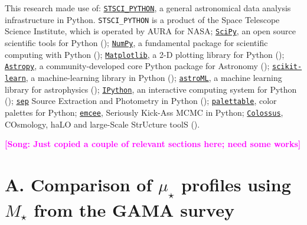 \documentclass[a4paper,fleqn,usenatbib]{mnras}
\def\mstar{{$M_{\star}$}}
\def\mden{{$\mu_{\star}$}}
\newcommand{\song}[1]{\textcolor{magenta}{\textbf{[Song: #1]}}}
\begin{document}
  This research made use of:
  \href{http://www.stsci.edu/institute/software_hardware/pyraf/stsci\_python}{\texttt{STSCI\_PYTHON}},
      a general astronomical data analysis infrastructure in Python. 
      \texttt{STSCI\_PYTHON} is a product of the Space Telescope Science Institute, 
      which is operated by AURA for NASA;
  \href{http://www.scipy.org/}{\texttt{SciPy}},
      an open source scientific tools for Python (\citealt{SciPy});
  \href{http://www.numpy.org/}{\texttt{NumPy}}, 
      a fundamental package for scientific computing with Python (\citealt{NumPy});
  \href{http://matplotlib.org/}{\texttt{Matplotlib}}, 
      a 2-D plotting library for Python (\citealt{Matplotlib});
  \href{http://www.astropy.org/}{\texttt{Astropy}}, a community-developed 
      core Python package for Astronomy (\citealt{AstroPy}); 
  \href{http://scikit-learn.org/stable/index.html}{\texttt{scikit-learn}},
      a machine-learning library in Python (\citealt{scikit-learn}); 
  \href{http://www.astroml.org/}{\texttt{astroML}}, 
      a machine learning library for astrophysics (\citealt{astroML});
  \href{https://ipython.org}{\texttt{IPython}}, 
      an interactive computing system for Python (\citealt{IPython});
  \href{https://github.com/kbarbary/sep}{\texttt{sep}} 
      Source Extraction and Photometry in Python (\citealt{PythonSEP});
  \href{https://jiffyclub.github.io/palettable/}{\texttt{palettable}},
      color palettes for Python;
  \href{http://dan.iel.fm/emcee/current/}{\texttt{emcee}}, 
      Seriously Kick-Ass MCMC in Python;
  \href{http://bdiemer.bitbucket.org/}{\texttt{Colossus}}, 
      COsmology, haLO and large-Scale StrUcture toolS (\citealt{Colossus}).





\clearpage

\clearpage


\appendix

\song{Just copied a couple of relevant sections here; need some works}
\section{A. Comparison of \mden{} profiles using \mstar{} from the GAMA survey}
    \label{app:gama} 
\end{document}
